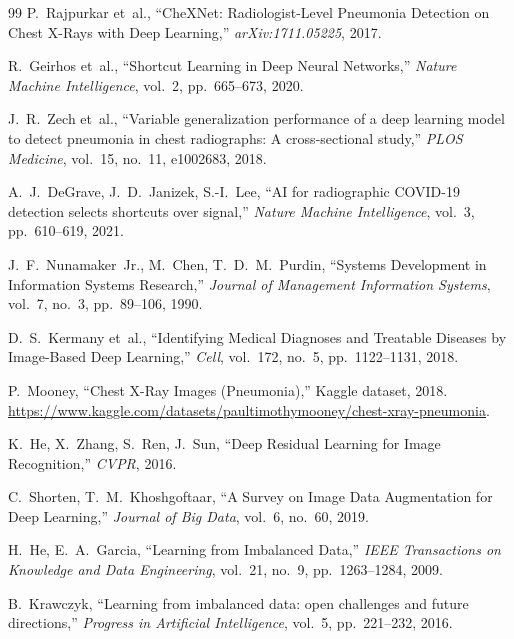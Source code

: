 \documentclass[10pt,twocolumn]{article}
\begin{document}
\begin{thebibliography}{99}
\small
{} P.~Rajpurkar et~al.,
``CheXNet: Radiologist-Level Pneumonia Detection on Chest X-Rays with Deep
Learning,'' \emph{arXiv:1711.05225}, 2017.

 R.~Geirhos et~al.,
``Shortcut Learning in Deep Neural Networks,'' \emph{Nature Machine
Intelligence}, vol.~2, pp.~665--673, 2020.

 J.~R.~Zech et~al.,
``Variable generalization performance of a deep learning model to detect
pneumonia in chest radiographs: A cross-sectional study,'' \emph{PLOS Medicine},
vol.~15, no.~11, e1002683, 2018.

 A.~J.~DeGrave, J.~D.~Janizek, S.-I.~Lee,
``AI for radiographic COVID-19 detection selects shortcuts over signal,''
\emph{Nature Machine Intelligence}, vol.~3, pp.~610--619, 2021.

 J.~F.~Nunamaker~Jr., M.~Chen, T.~D.~M.~Purdin,
``Systems Development in Information Systems Research,'' \emph{Journal of
Management Information Systems}, vol.~7, no.~3, pp.~89--106, 1990.

 D.~S.~Kermany et~al.,
``Identifying Medical Diagnoses and Treatable Diseases by Image-Based Deep
Learning,'' \emph{Cell}, vol.~172, no.~5, pp.~1122--1131, 2018.

 P.~Mooney,
``Chest X-Ray Images (Pneumonia),'' Kaggle dataset, 2018.
\url{https://www.kaggle.com/datasets/paultimothymooney/chest-xray-pneumonia}.

 K.~He, X.~Zhang, S.~Ren, J.~Sun,
``Deep Residual Learning for Image Recognition,'' \emph{CVPR}, 2016.

 C.~Shorten, T.~M.~Khoshgoftaar,
``A Survey on Image Data Augmentation for Deep Learning,'' \emph{Journal of Big
Data}, vol.~6, no.~60, 2019.

 H.~He, E.~A.~Garcia,
``Learning from Imbalanced Data,'' \emph{IEEE Transactions on Knowledge and Data
Engineering}, vol.~21, no.~9, pp.~1263--1284, 2009.

 B.~Krawczyk,
``Learning from imbalanced data: open challenges and future directions,''
\emph{Progress in Artificial Intelligence}, vol.~5, pp.~221--232, 2016.


\end{thebibliography}
\end{document}
